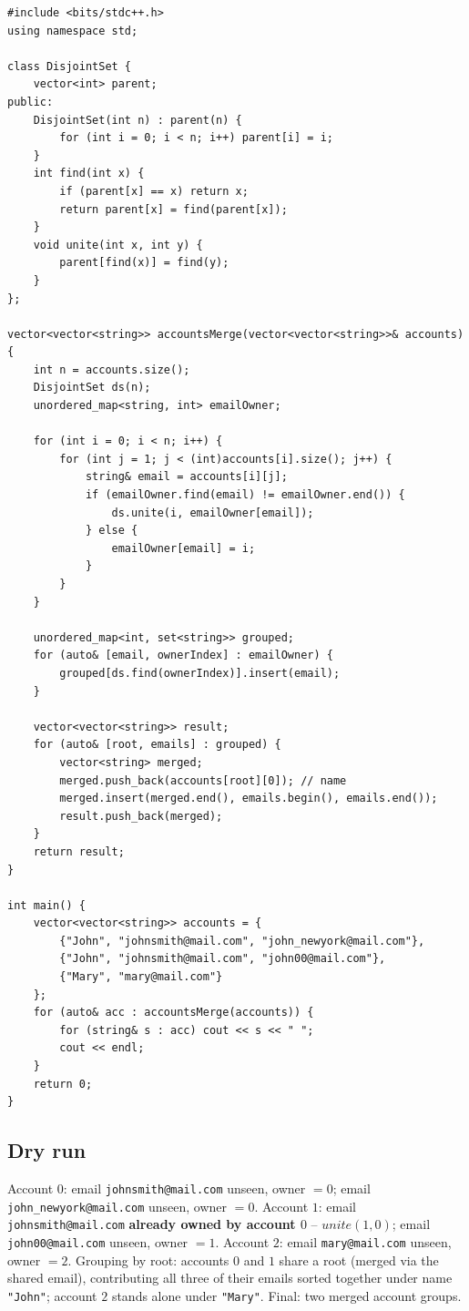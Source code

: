 \begin{lstlisting}
#include <bits/stdc++.h>
using namespace std;

class DisjointSet {
    vector<int> parent;
public:
    DisjointSet(int n) : parent(n) {
        for (int i = 0; i < n; i++) parent[i] = i;
    }
    int find(int x) {
        if (parent[x] == x) return x;
        return parent[x] = find(parent[x]);
    }
    void unite(int x, int y) {
        parent[find(x)] = find(y);
    }
};

vector<vector<string>> accountsMerge(vector<vector<string>>& accounts) {
    int n = accounts.size();
    DisjointSet ds(n);
    unordered_map<string, int> emailOwner;

    for (int i = 0; i < n; i++) {
        for (int j = 1; j < (int)accounts[i].size(); j++) {
            string& email = accounts[i][j];
            if (emailOwner.find(email) != emailOwner.end()) {
                ds.unite(i, emailOwner[email]);
            } else {
                emailOwner[email] = i;
            }
        }
    }

    unordered_map<int, set<string>> grouped;
    for (auto& [email, ownerIndex] : emailOwner) {
        grouped[ds.find(ownerIndex)].insert(email);
    }

    vector<vector<string>> result;
    for (auto& [root, emails] : grouped) {
        vector<string> merged;
        merged.push_back(accounts[root][0]); // name
        merged.insert(merged.end(), emails.begin(), emails.end());
        result.push_back(merged);
    }
    return result;
}

int main() {
    vector<vector<string>> accounts = {
        {"John", "johnsmith@mail.com", "john_newyork@mail.com"},
        {"John", "johnsmith@mail.com", "john00@mail.com"},
        {"Mary", "mary@mail.com"}
    };
    for (auto& acc : accountsMerge(accounts)) {
        for (string& s : acc) cout << s << " ";
        cout << endl;
    }
    return 0;
}
\end{lstlisting}

\subsection*{Dry run}


Account $0$: email \texttt{johnsmith@mail.com} unseen, owner $=0$;
email \texttt{john\_newyork@mail.com} unseen, owner $=0$. Account $1$:
email \texttt{johnsmith@mail.com} \textbf{already owned by account
$0$} -- $\textit{unite}(1,0)$; email \texttt{john00@mail.com} unseen,
owner $=1$. Account $2$: email \texttt{mary@mail.com} unseen, owner
$=2$. Grouping by root: accounts $0$ and $1$ share a root (merged via
the shared email), contributing all three of their emails sorted
together under name \texttt{"John"}; account $2$ stands alone under
\texttt{"Mary"}. Final: two merged account groups.

